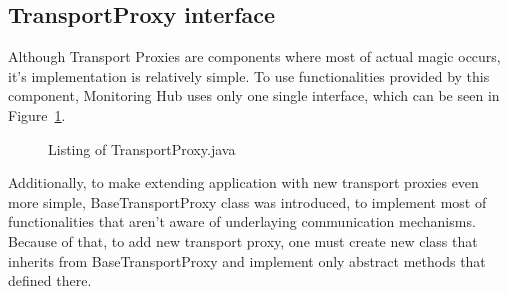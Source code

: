 \subsection{TransportProxy interface}
Although Transport Proxies are components where most of actual magic occurs, it\rq{}s implementation is relatively simple. To use functionalities provided by this component, Monitoring Hub uses only one single interface, which can be seen in Figure~\ref{fig:transport_proxy}.

\begin{figure}[ht]
  \centering
  
  \caption{Listing of TransportProxy.java}
  \label{fig:transport_proxy}
\end{figure} 

Additionally, to make extending application with new transport proxies even more simple, BaseTransportProxy class was introduced, to implement most of functionalities that aren\rq{}t aware of underlaying communication mechanisms. Because of that, to add new transport proxy, one must create new class that inherits from BaseTransportProxy and implement only abstract methods that defined there.
